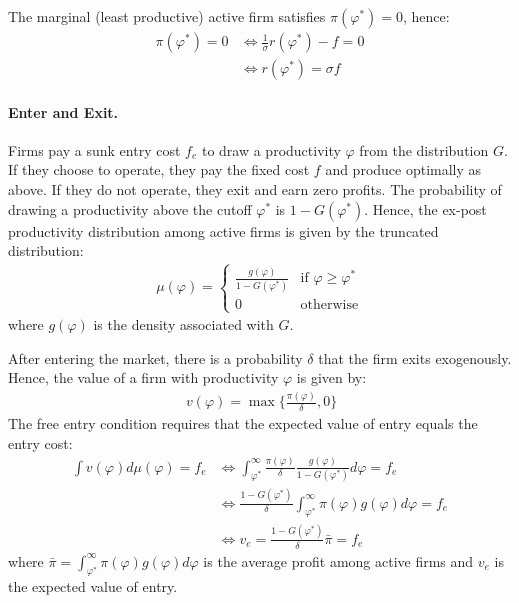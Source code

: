 \begin{solution}
    The marginal (least productive) active firm satisfies $\pi(\varphi^*)=0$, hence:
    \begin{align*}
        \pi(\varphi^*) = 0 &\iff \frac{1}{\sigma} r(\varphi^*) - f = 0 \\
        &\iff r(\varphi^*) = \sigma f 
    \end{align*}

    \paragraph{Enter and Exit.} Firms pay a sunk entry cost $f_e$ to draw a productivity $\varphi$ from the distribution $G$. If they choose to operate, they pay the fixed cost $f$ and produce optimally as above. If they do not operate, they exit and earn zero profits. The probability of drawing a productivity above the cutoff $\varphi^*$ is $1 - G(\varphi^*)$. Hence, the ex-post productivity distribution among active firms is given by the truncated distribution:
    \begin{align*}
        \mu(\varphi) = \begin{cases}
            \frac{g(\varphi)}{1 - G(\varphi^*)} & \text{if } \varphi \geq \varphi^*\\
            0 & \text{otherwise}
        \end{cases}
    \end{align*}
    where $g(\varphi)$ is the density associated with $G$.

    After entering the market, there is a probability $\delta$ that the firm exits exogenously. Hence, the value of a firm with productivity $\varphi$ is given by:
    \begin{align*}\
        v(\varphi) = \max\{\frac{\pi(\varphi)}{\delta}, 0\}
    \end{align*}
    The free entry condition requires that the expected value of entry equals the entry cost:
    \begin{align*}
        \int v(\varphi) d\mu(\varphi) = f_e &\iff \int_{\varphi^*}^{\infty} \frac{\pi(\varphi)}{\delta} \frac{g(\varphi)}{1 - G(\varphi^*)} d\varphi = f_e \\
        &\iff \frac{1-G(\varphi^*)}{\delta} \int_{\varphi^*}^{\infty} \pi(\varphi) g(\varphi) d\varphi = f_e \\
        &\iff v_e = \frac{1-G(\varphi^*)}{\delta} \bar{\pi} = f_e
    \end{align*}
    where $\bar{\pi} = \int_{\varphi^*}^{\infty} \pi(\varphi) g(\varphi) d\varphi$ is the average profit among active firms and $v_e$ is the expected value of entry.
    

\end{solution}
